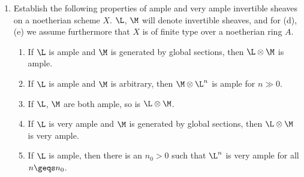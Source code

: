 \documentclass[12pt]{amsart}
\begin{document}
\begin{enumerate}
  \item[7.5.] {
      Establish the following properties of ample and very ample invertible sheaves on a noetherian scheme $X$.
      $\L$, $\M$ will denote invertible sheaves, and for (d), (e) we assume furthermore that $X$ is of finite type over a noetherian ring $A$.
      \begin{enumerate}
        \item If $\L$ is ample and $\M$ is generated by global sections, then $\L\otimes \M$ is ample.
        \item If $\L$ is ample and $\M$ is arbitrary, then $\M\otimes \L^n$ is ample for $n\gg0$.
        \item If $\L$, $\M$ are both ample, so is $\L\otimes \M$.
        \item If $\L$ is very ample and $\M$ is generated by global sections, then $\L\otimes \M$ is very ample.
        \item If $\L$ is ample, then there is an $n_0>0$ such that $\L^n$ is very ample for all $n\geqs n_0$.
      \end{enumerate}
    }
\end{enumerate}
\end{document}
